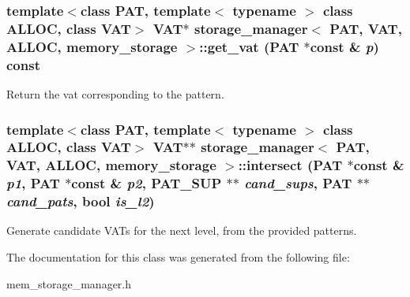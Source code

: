 \subsubsection{\setlength{\rightskip}{0pt plus 5cm}template$<$class PAT, template$<$ typename $>$ class ALLOC, class VAT$>$ VAT$\ast$ \bf{storage\_\-manager}$<$ PAT, VAT, ALLOC, \bf{memory\_\-storage} $>$::get\_\-vat (PAT $\ast$const \& {\em p}) const\hspace{0.3cm}{\tt  [inline]}}\label{classstorage__manager_3_01PAT_00_01VAT_00_01ALLOC_00_01memory__storage_01_4_f1b81ff2505352a3b9d34733cfe51926}


Return the vat corresponding to the pattern. 
\subsubsection{\setlength{\rightskip}{0pt plus 5cm}template$<$class PAT, template$<$ typename $>$ class ALLOC, class VAT$>$ VAT$\ast$$\ast$ \bf{storage\_\-manager}$<$ PAT, VAT, ALLOC, \bf{memory\_\-storage} $>$::intersect (PAT $\ast$const \& {\em p1}, PAT $\ast$const \& {\em p2}, \bf{PAT\_\-SUP} $\ast$$\ast$ {\em cand\_\-sups}, PAT $\ast$$\ast$ {\em cand\_\-pats}, bool {\em is\_\-l2})\hspace{0.3cm}{\tt  [inline]}}\label{classstorage__manager_3_01PAT_00_01VAT_00_01ALLOC_00_01memory__storage_01_4_6232a8d6f413103d5ca623a8ffae3091}


Generate candidate VATs for the next level, from the provided patterns. 

The documentation for this class was generated from the following file:\begin{CompactItemize}
\item 
mem\_\-storage\_\-manager.h\end{CompactItemize}

